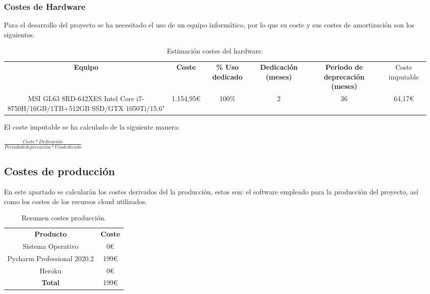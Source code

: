 \subsubsection{Costes de Hardware}

Para el desarrollo del proyecto se ha necesitado el uso de un equipo informático, por lo que su coste y sus costes de amortización son los siguientes.

\begin{table}[H]
	\begin{center}
		\begin{adjustbox}{max width=\textwidth}
			\begin{tabular}{| c | c | c | c | c | c |}
				\hline
				
				\textbf{Equipo} & \textbf{Coste} & \textbf{\% Uso dedicado} & \textbf{Dedicación (meses)} & \textbf{Periodo de deprecación (meses)} & Coste imputable \\
				MSI GL63 8RD-642XES Intel Core i7-8750H/16GB/1TB+512GB SSD/GTX
				1050Ti/15.6" & 1.154,95€ & 100\% & 2 & 36 & 64,17€ \\ \hline
			\end{tabular}
		\end{adjustbox}
		\caption{Estimación costes del hardware.}
	\end{center}
\end{table}

El coste imputable se ha calculado de la siguiente manera:

\begin{center}
	$ \frac{Coste * Dedicación}{Periodo de deprecación * Uso dedicado} $ 
\end{center} 


\subsection{Costes de producción}

En este apartado se calcularán los costes derivados del la producción, estos son: el software empleado para la producción del proyecto, así como los costes de los recursos cloud utilizados.

\begin{table}[H]
	\begin{center}
		\begin{tabular}{| c | c |}
			\hline
			
			\textbf{Producto} & \textbf{Coste} \\
			Sistema Operativo & 0€ \\
			Pycharm Professional 2020.2 & 199€ \\
			Heroku & 0€ \\
			\textbf{Total} & 199€ \\ \hline
		\end{tabular}
		\caption{Resumen costes producción.}
	\end{center}
\end{table}

